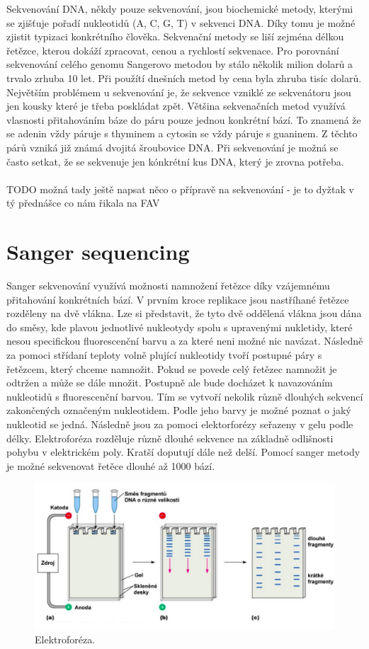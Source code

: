 \documentclass[czech,DP]{thesiskiv}
\numberwithin{equation}{section}
\begin{document}
\noindent
Sekvenování DNA, někdy pouze sekvenování, jsou biochemické metody, kterými se zjišťuje pořadí nukleotidů (A, C, G, T) v sekvenci DNA. Díky tomu je možné zjistit typizaci konkrétního člověka. Sekvenační metody se liší zejména délkou řetězce, kterou dokáží zpracovat, cenou a rychlostí sekvenace. Pro porovnání sekvenování celého genomu Sangerovo metodou by stálo několik milion dolarů a trvalo zrhuba 10 let. Při použítí dnešních metod by cena byla zhruba tisíc dolarů. Největším problémem u sekvenování je, že sekvence vzniklé ze sekvenátoru jsou jen kousky které je třeba poskládat zpět. Většina sekvenačních metod využívá vlasnosti přitahováním báze do páru pouze jednou konkrétní bází. To znamená že se adenin vždy páruje s thyminem a cytosin se vždy páruje s guaninem. Z těchto párů vzniká již známá dvojitá šroubovice DNA. Při sekvenování je možná se často setkat, že se sekvenuje jen kónkrétní kus DNA, který je zrovna potřeba. \cite{sekvenovani_ziva}
\\
\\
TODO možná tady ještě napsat něco o přípravě na sekvenování - je to dyžtak v tý přednášce co nám řikala na FAV
\section{Sanger sequencing}
Sanger sekvenování využívá možnosti namnožení řetězce díky vzájemnému přitahování konkrétních bází. V prvním kroce replikace jsou nastříhané řetězce rozděleny na dvě vlákna. Lze si představit, že tyto dvě oddělená vlákna jsou dána do směsy, kde plavou jednotlivé nukleotydy spolu s upravenými nukletidy, které nesou specifickou fluorescenční barvu a za které neni možné nic navázat. Následně za pomoci střídaní teploty volně plující nukleotidy tvoří postupné páry s řetězcem, který chceme namnožit. Pokud se povede celý řetězec namnožit je odtržen a může se dále množit. Postupně ale bude docházet k navazováním nukleotidů s fluorescenční barvou. Tím se vytvoří nekolik různě dlouhých sekvencí zakončených označeným nukleotidem. Podle jeho barvy je možné poznat o jaký nukleotid se jedná. Následně jsou za pomoci elektorforézy seřazeny v gelu podle délky. Elektroforéza rozděluje různě dlouhé sekvence na základně odlišnosti pohybu v elektrickém poly. Kratší doputují dále než delší. Pomocí sanger metody je možné sekvenovat řetěce dlouhé až 1000 bází.   

\begin{figure}[H]		
		\centering
		\includegraphics[width=\textwidth]{./img/elektroforeza.png}
		\caption{Elektroforéza. \cite{elektroforeza_img}}
		\label{fig:elektroforeza}
\end{figure}
 
\end{document}

